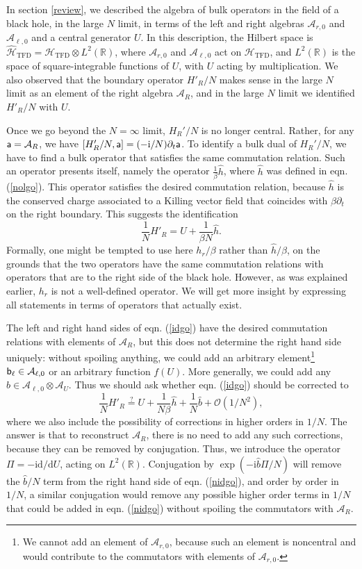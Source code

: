\documentclass[11pt,a4paper]{article}
\def\a{{\sf a}}
\def\b{{\sf b}}
\def\i{{\mathrm i}}
\def\be{\begin{equation}}
\def\ee{\end{equation}}
\def\h{\widehat}
\def\O{{\mathcal O}}
\def\A{{\mathcal A}}
\def\d{{\mathrm d}}
\def\R{{\mathbb R}}
\def\U{{ U}}
\def\h{\widehat}
\def\H{{\mathcal H}}
\def\TFD{{\mathrm{TFD}}}
\begin{document}
In section \ref{review}, we described the algebra of bulk operators in the field of a black hole, in the large $N$ limit, 
in terms of the left and right algebras $\A_{r,0}$ and $\A_{\ell,0}$
and a central generator $\U$.   In this description, the Hilbert space is $\h\H_\TFD=\H_\TFD\otimes L^2(\R)$, where $\A_{r,0}$ and $\A_{\ell,0}$ act on $\H_\TFD$,
and  $L^2(\R)$ is the space of square-integrable functions of $\U$, with $\U$ acting by multiplication.
We also observed that the boundary operator $H'_R/N$ makes sense in the large $N$ limit as an element of the right algebra $\A_R$,
and  in the large $N$ limit we identified $H'_R/N$ with $\U$.

Once we go beyond the $N=\infty$ limit, $H_R'/N$ is no longer central.   Rather, for any $\a=\A_R$, we have $[H'_R/N,\a]=(-\i/N)\partial_t \a$.
To identify a bulk dual of $H_R'/N$, we have to find a bulk operator that satisfies the same commutation relation.   Such an operator presents itself,
namely the operator ${\frac{1}{\beta}\h h}$, where $\h h$ was defined in eqn. (\ref{nolgo}).  This operator satisfies the desired commutation relation, because $\h h$  is the conserved
charge associated to a Killing vector field that coincides with $\beta\partial_t$ on the right boundary.   This suggests the identification
\be\label{idgo}\frac{1}{N}H'_R=\U+\frac{1}{\beta N}\h h. \ee
Formally, one might be tempted to use here $h_r/\beta$ rather than $\h h/\beta$, on the grounds that the two operators have the same commutation relations with operators
that are to the right side of the black hole.   However, as was explained earlier, $h_r$ is not a well-defined operator.    We will  get 
more insight by expressing all statements in terms of operators that actually exist.  

The left and right hand sides of eqn. (\ref{idgo}) have the desired commutation relations with elements of $\A_R$, but this does not determine the right hand side
uniquely: without spoiling anything, we could add  an arbitrary element\footnote{We cannot add an element of $\A_{r,0}$, because such an element is noncentral
and would contribute to the commutators with elements of $\A_{r,0}$.} $\b_\ell\in \A_{\ell,0}$ or an arbitrary function $f(\U)$.  
 More generally, we could add any $\h b \in \A_{\ell,0}\otimes \A_\U$.   Thus we should ask whether eqn. (\ref{idgo}) should be corrected to \be\label{nidgo}\frac{1}{N}H'_R\overset{?}{=}\U+\frac{1}{N\beta }\h h+\frac{1}{N}\h b +\O(1/N^2),\ee
where we also include the possibility of corrections in higher orders in $1/N$.   The answer is that  to reconstruct $\A_R$,  there is no need to
add any such corrections, because they can be removed by conjugation.   Thus, we introduce the operator $\Pi=-\i\d/\d\U$, acting on $L^2(\R)$.
Conjugation by $\exp(-\i\h b\Pi/N)$ will remove the $\h b/N$ term from the right hand side of eqn. (\ref{nidgo}), and order by order in $1/N$, a similar conjugation would remove
any possible higher order terms in $1/N$ that could be added in eqn. (\ref{nidgo}) without spoiling the commutators with $\A_R$.  
\end{document}
